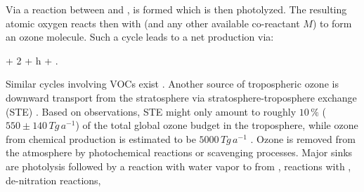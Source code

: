 \documentclass[gmd, manuscript]{copernicus}
\begin{document}
Via a reaction between  and ,  is formed which is then photolyzed. The resulting atomic oxygen reacts then with  (and any other available co-reactant $M$) to form an ozone molecule.
Such a cycle leads to a net production via:
\begin{reaction}
   + 2 + h\nu \rightarrow {} + .
\end{reaction}
Similar cycles involving VOCs exist \citep{ACP:Monks2015}. Another source of tropospheric ozone is downward transport from the stratosphere via stratosphere-troposphere exchange (STE) \citep{WMO2014}. Based on observations, STE might only amount to roughly $10\,\unit{\%}$ ($550 \pm 140\,\unit{Tg\,a^{-1}}$) of the total global ozone budget in the troposphere, while ozone from chemical production is estimated to be $5000\,\unit{Tg\,a^{-1}}$ \citep{ACP:Monks2015}. Ozone is removed from the atmosphere by photochemical reactions or scavenging processes. Major sinks are photolysis followed by a reaction with water vapor to from ,
reactions with ,
de-nitration reactions,
\end{document}
